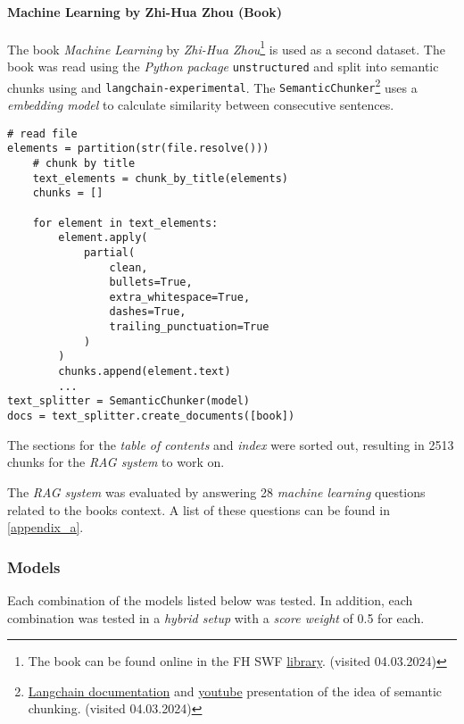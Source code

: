 \documentclass{article}
\begin{document}
\paragraph{Machine Learning by Zhi-Hua Zhou (Book)}
The book \textit{Machine Learning} by \textit{Zhi-Hua Zhou}\footnote{The book can be found online in the FH SWF \href{https://kai.fh-swf.de/permalink/49HBZ_FSW/ou32r9/alma99370954148406441}{library}. (visited 04.03.2024)} \cite{mlBook} is used as a second dataset. The book was read using the \textit{Python package} \colorbox{lightgray!25}{\lstinline{unstructured}} and split into semantic chunks using  and \colorbox{lightgray!25}{\lstinline{langchain-experimental}}. The \colorbox{lightgray!25}{\lstinline{SemanticChunker}}\footnote{\href{https://python.langchain.com/docs/modules/data_connection/document_transformers/semantic-chunker}{Langchain documentation} and \href{https://www.youtube.com/watch?v=8OJC21T2SL4&t=1930s}{youtube} presentation of the idea of semantic chunking. (visited 04.03.2024)} uses a \textit{embedding model} to calculate similarity between consecutive sentences.

\begin{lstlisting}[backgroundcolor = \color{lightgray!25}]
# read file
elements = partition(str(file.resolve()))
    # chunk by title
    text_elements = chunk_by_title(elements)
    chunks = []

    for element in text_elements:
        element.apply(
            partial(
                clean,
                bullets=True,
                extra_whitespace=True,
                dashes=True,
                trailing_punctuation=True
            )
        )
        chunks.append(element.text)  
        ...
text_splitter = SemanticChunker(model)
docs = text_splitter.create_documents([book])
\end{lstlisting}
The sections for the \textit{table of contents} and \textit{index} were sorted out, resulting in 2513 chunks for the \textit{RAG system} to work on.

The \textit{RAG system} was evaluated by answering 28 \textit{machine learning} questions related to the books context. A list of these questions can be found in \cref{appendix_a}.

\subsubsection{Models}
Each combination of the models listed below was tested. In addition, each combination was tested in a \textit{hybrid setup} with a \textit{score weight} of 0.5 for each.
\end{document}
